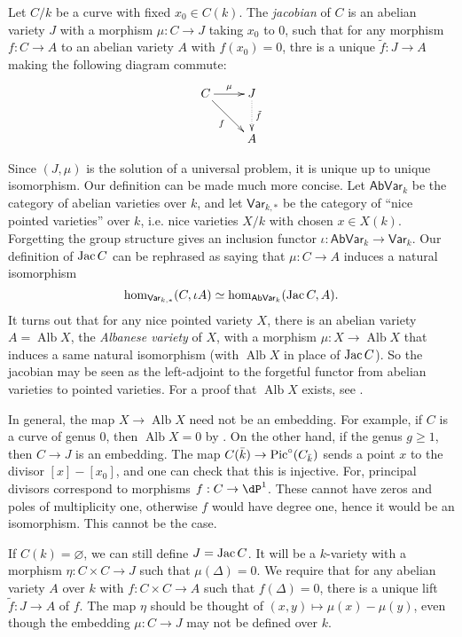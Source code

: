 \begin{definition}[Albanese]
Let $C/k$ be a curve with fixed $x_0\in C(k)$. The \emph{jacobian} of $C$ is 
an abelian variety $J$ with a morphism $\mu:C\to J$ taking $x_0$ to $0$, such 
that for any morphism $f:C\to A$ to an abelian variety $A$ with $f(x_0)=0$, 
thre is a unique $\tilde f:J\to A$ making the following diagram commute:
\[\xymatrix{
  C \ar[r]^-\mu \ar[dr]_-f 
    & J \ar@{.>}[d]^-{\tilde f} \\
  & A
}\]
\end{definition}

Since $(J,\mu)$ is the solution of a universal problem, it is unique up to 
unique isomorphism. Our definition can be made much more concise. Let 
$\mathsf{AbVar}_k$ be the category of abelian varieties over $k$, and let 
$\mathsf{Var}_{k,\ast}$ be the category of ``nice pointed varieties'' over $k$, 
i.e. nice varieties $X/k$ with chosen $x\in X(k)$. Forgetting the group 
structure gives an inclusion functor 
$\iota:\mathsf{AbVar}_k\to \mathsf{Var}_k$. Our definition of $\operatorname{Jac} C$ can be 
rephrased as saying that $\mu:C\to A$ induces a natural isomorphism 
\[
  \hom_{\mathsf{Var}_{k,\ast}}(C,\iota A) \simeq \hom_{\mathsf{AbVar}_k}(\operatorname{Jac} C,A)\text{.}
\]
It turns out that for any nice pointed variety $X$, there is an abelian variety 
$A=\operatorname{Alb} X$, the \emph{Albanese variety} of $X$, with a morphism 
$\mu:X\to \operatorname{Alb} X$ that induces a same natural isomorphism (with 
$\operatorname{Alb} X$ in place of $\operatorname{Jac} C$). So the jacobian may be seen as 
the left-adjoint to the forgetful functor from abelian varieties to pointed 
varieties. For a proof that $\operatorname{Alb} X$ exists, see 
\cite[A.11]{mo12}.

In general, the map $X\to \operatorname{Alb} X$ need not be an embedding. 
For example, if $C$ is a curve of genus $0$, then $\operatorname{Alb} X=0$ by 
\cite[I.3.9]{mi-av}. On the other hand, if the genus $g\geqslant 1$, then 
$C\to J$ is an embedding. The map $C(\bar k)\to \operatorname{Pic}^\circ(C_{\bar k})$ sends 
a point $x$ to the divisor $[x]-[x_0]$, and one can check that this is 
injective. For, principal divisors correspond to morphisms 
$f:C\to\dP^1$. These cannot have zeros and poles of multiplicity one, 
otherwise $f$ would have degree one, hence it would be an isomorphism. This 
cannot be the case. 

If $C(k)=\varnothing$, we can still define $J=\operatorname{Jac} C$. It will be a $k$-variety 
with a morphism $\eta:C\times C\to J$ such that $\mu(\Delta)=0$. We require 
that for any abelian variety $A$ over $k$ with $f:C\times C\to A$ such that 
$f(\Delta)=0$, there is a unique lift $\tilde f:J\to A$ of $f$. The map $\eta$ 
should be thought of $(x,y)\mapsto \mu(x)-\mu(y)$, even though the embedding 
$\mu:C\to J$ may not be defined over $k$. 






